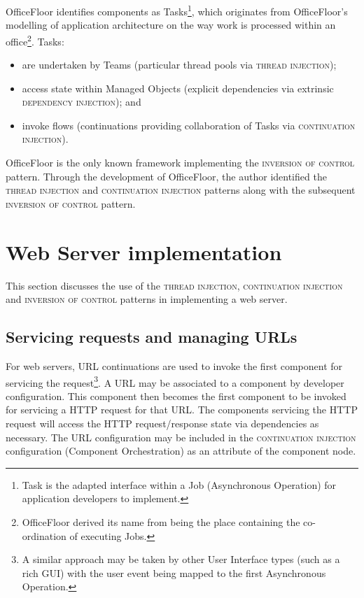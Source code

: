 \documentclass[prodmode]{style/acmlarge}
\begin{document}
OfficeFloor \cite{officefloor} identifies components as Tasks\footnote{Task is
the adapted interface within a Job (Asynchronous Operation) for application
developers to implement.}, which originates from OfficeFloor's modelling of
application architecture on the way work is processed within an
office\footnote{OfficeFloor derived its name from being the place containing the
co-ordination of executing Jobs.}.  Tasks:
\begin{itemize}
  \item are undertaken by Teams (particular thread pools via \textsc{thread injection});
  \item access state within Managed Objects (explicit dependencies via extrinsic \textsc{dependency injection}); and
  \item invoke flows (continuations providing collaboration of Tasks via \textsc{continuation injection}).
\end{itemize}

OfficeFloor is the only known framework implementing the \textsc{inversion of
control} pattern.  Through the development of OfficeFloor, the author identified
the \textsc{thread injection} and \textsc{continuation injection} patterns along
with the subsequent \textsc{inversion of control} pattern.



\section{Web Server implementation}

This section discusses the use of the \textsc{thread injection},
\textsc{continuation injection} and \textsc{inversion of control} patterns in
implementing a web server.


\subsection{Servicing requests and managing URLs}

For web servers, URL continuations \cite{url-continuation} are used to invoke
the first component for servicing the request\footnote{A similar approach may be
taken by other User Interface types (such as a rich GUI) with the user event
being mapped to the first Asynchronous Operation.}.  A URL may be associated to
a component by developer configuration.  This component then becomes the first
component to be invoked for servicing a HTTP request for that URL.  The
components servicing the HTTP request will access the HTTP request/response
state via dependencies as necessary.  The URL configuration may be included in
the \textsc{continuation injection} configuration (Component Orchestration) as
an attribute of the component node.
\end{document}
